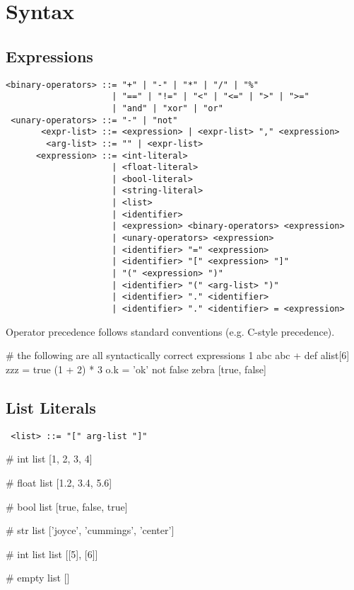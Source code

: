 \section{Syntax}

\subsection{Expressions}
\begin{verbatim}
<binary-operators> ::= "+" | "-" | "*" | "/" | "%"
                     | "==" | "!=" | "<" | "<=" | ">" | ">="
                     | "and" | "xor" | "or"
 <unary-operators> ::= "-" | "not"
       <expr-list> ::= <expression> | <expr-list> "," <expression>
        <arg-list> ::= "" | <expr-list>
      <expression> ::= <int-literal>
                     | <float-literal>
                     | <bool-literal>
                     | <string-literal>
                     | <list>
                     | <identifier>
                     | <expression> <binary-operators> <expression>
                     | <unary-operators> <expression>
                     | <identifier> "=" <expression>
                     | <identifier> "[" <expression> "]"
                     | "(" <expression> ")"
                     | <identifier> "(" <arg-list> ")"
                     | <identifier> "." <identifier>
                     | <identifier> "." <identifier> = <expression>
\end{verbatim}

\noindent
Operator precedence follows standard conventions (e.g. C-style precedence).

\begin{mylistingn}
# the following are all syntactically correct expressions
1
abc
abc + def
alist[6]
zzz = true
(1 + 2) * 3
o.k = 'ok'
not false
zebra %
[true, false]
\end{mylistingn}

\subsection{List Literals}
\begin{verbatim}
 <list> ::= "[" arg-list "]"
\end{verbatim}

\begin{mylistingn}
# int list
[1, 2, 3, 4]

# float list
[1.2, 3.4, 5.6]

# bool list
[true, false, true]

# str list
['joyce', 'cummings', 'center']

# int list list
[[5], [6]]

# empty list
[]
\end{mylistingn}

